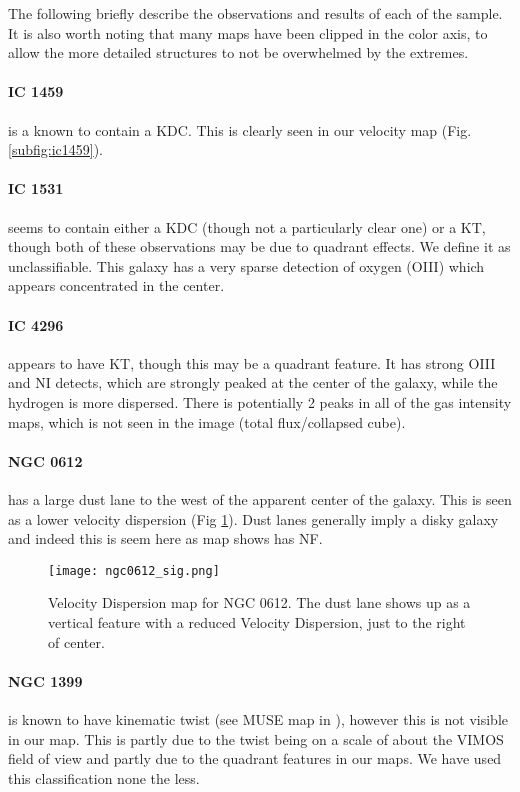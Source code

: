 \documentclass[a4paper,fleqn,usenatbib,useAMS]{mnras}
\begin{document}
	The following briefly describe the observations and results of each of the sample. It is also worth noting that many maps have been clipped in the color axis, to allow the more detailed structures to not be overwhelmed by the extremes. 

	\paragraph{IC 1459} is a known to contain a KDC. This is clearly seen in our velocity map (Fig. \ref{subfig:ic1459}).

	\paragraph{IC 1531} seems to contain either a KDC (though not a particularly clear one) or a KT, though both of these observations may be due to quadrant effects. We define it as unclassifiable. This galaxy has a very sparse detection of oxygen (OIII) which appears concentrated in the center.

	\paragraph{IC 4296} appears to have KT, though this may be a quadrant feature. It has strong OIII and NI detects, which are strongly peaked at the center of the galaxy, while the hydrogen is more dispersed. There is potentially 2 peaks in all of the gas intensity maps, which is not seen in the image (total flux/collapsed cube).

	\paragraph{NGC 0612} has a large dust lane to the west of the apparent center of the galaxy. This is seen as a lower velocity dispersion (Fig \ref{fig:ngc0612_sig}). Dust lanes generally imply a disky galaxy and indeed this is seem here as map shows has NF. 

	\begin{figure}[!ht]
		\centering
		\texttt{[image: ngc0612\_sig.png]}
		\caption{Velocity Dispersion map for NGC 0612. The dust lane shows up as a vertical feature with a reduced Velocity Dispersion, just to the right of center.}
		\label{fig:ngc0612_sig}
	\end{figure}

	\paragraph{NGC 1399} is known to have kinematic twist (see MUSE map in \citet{Zieleniewski2017}), however this is not visible in our map. This is partly due to the twist being on a scale of about the VIMOS field of view and partly due to the quadrant features in our maps. We have used this classification none the less. 
\end{document}
